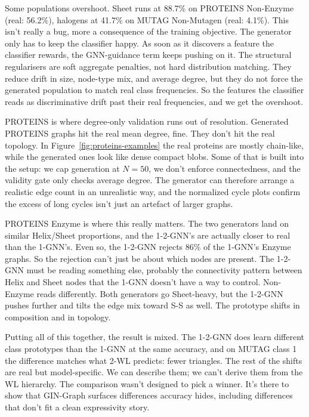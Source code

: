 \documentclass[12pt,a4paper]{article}
\begin{document}
Some populations overshoot. Sheet runs at 88.7\% on PROTEINS Non-Enzyme (real: 56.2\%), halogens at 41.7\% on MUTAG Non-Mutagen (real: 4.1\%). This isn't really a bug, more a consequence of the training objective. The generator only has to keep the classifier happy. As soon as it discovers a feature the classifier rewards, the GNN-guidance term keeps pushing on it. The structural regularisers are soft aggregate penalties, not hard distribution matching. They reduce drift in size, node-type mix, and average degree, but they do not force the generated population to match real class frequencies. So the features the classifier reads as discriminative drift past their real frequencies, and we get the overshoot.

PROTEINS is where degree-only validation runs out of resolution. Generated PROTEINS graphs hit the real mean degree, fine. They don't hit the real topology. In Figure~\ref{fig:proteins-examples} the real proteins are mostly chain-like, while the generated ones look like dense compact blobs. Some of that is built into the setup: we cap generation at $N=50$, we don't enforce connectedness, and the validity gate only checks average degree. The generator can therefore arrange a realistic edge count in an unrealistic way, and the normalized cycle plots confirm the excess of long cycles isn't just an artefact of larger graphs.

PROTEINS Enzyme is where this really matters. The two generators land on similar Helix/Sheet proportions, and the 1-2-GNN's are actually closer to real than the 1-GNN's. Even so, the 1-2-GNN rejects 86\% of the 1-GNN's Enzyme graphs. So the rejection can't just be about which nodes are present. The 1-2-GNN must be reading something else, probably the connectivity pattern between Helix and Sheet nodes that the 1-GNN doesn't have a way to control. Non-Enzyme reads differently. Both generators go Sheet-heavy, but the 1-2-GNN pushes further and tilts the edge mix toward S-S as well. The prototype shifts in composition and in topology.

Putting all of this together, the result is mixed. The 1-2-GNN does learn different class prototypes than the 1-GNN at the same accuracy, and on MUTAG class 1 the difference matches what 2-WL predicts: fewer triangles. The rest of the shifts are real but model-specific. We can describe them; we can't derive them from the WL hierarchy. The comparison wasn't designed to pick a winner. It's there to show that GIN-Graph surfaces differences accuracy hides, including differences that don't fit a clean expressivity story.
\end{document}
